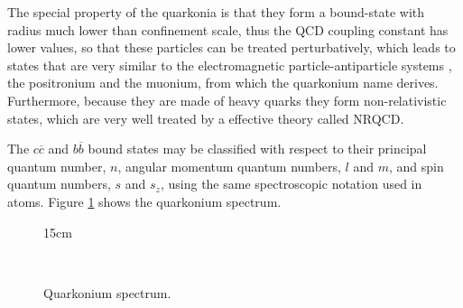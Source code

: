 The special property of the quarkonia is that they form a bound-state with radius much lower than confinement scale, thus the QCD coupling constant has lower values, so that these particles can be treated perturbatively, which leads to states that are very similar to the electromagnetic particle-antiparticle systems \cite{Burgess:2006hbd}, the positronium and the muonium, from which the quarkonium name derives. Furthermore, because they are made of heavy quarks they form non-relativistic states, which are very well treated by a effective theory called NRQCD.

The $c\overline{c}$ and $b\overline{b}$ bound states may be classified with respect to their principal quantum number, $n$, angular momentum quantum numbers, $l$ and $m$, and spin quantum numbers, $s$ and $s_z$, using the same spectroscopic notation used in atoms. Figure \ref{fig:qq_spectrum} shows the quarkonium spectrum.

\begin{figure}[!htm]{15cm}
  \caption{Quarkonium spectrum.} 
  \label{fig:qq_spectrum}
  \hfill
  \\
\end{figure}

